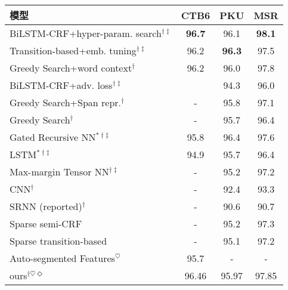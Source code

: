 \begin{table}[t]
	\vspace{0.5em}\centering\wuhao
	\begin{tabular}{lc c c}
		\toprule[1.5pt]
		模型 & CTB6 & PKU & MSR \\
		\midrule[1pt]
		BiLSTM-CRF+hyper-param. search$^{\dagger\ddagger}$  \cite{ma-ganchev-weiss:2018:EMNLP} & \textbf{96.7} & 96.1 & \textbf{98.1} \\
		Transition-based+emb. tuning$^{\dagger\ddagger}$  \cite{yang-zhang-dong:2017:Long} & 96.2 & \textbf{96.3} & 97.5 \\
		Greedy Search+word context$^{\dagger}$ \cite{zhou-EtAl:2017:EMNLP2017} & 96.2 & 96.0 & 97.8 \\
		BiLSTM-CRF+adv. loss$^{\dagger\ddagger}$ \cite{chen-EtAl:2017:Long2} & & 94.3 & 96.0 \\
		Greedy Search+Span repr.$^{\dagger}$ \cite{cai-EtAl:2017:Short} & - & 95.8 & 97.1 \\
		Greedy Search$^{\dagger}$ \cite{cai-zhao:2016:P16-1} & - & 95.7 & 96.4 \\
		Gated Recursive NN$^{*\dagger\ddagger}$ \cite{chen-EtAl:2015:ACL-IJCNLP5} & 95.8 & 96.4 & 97.6 \\
		LSTM$^{*\dagger\ddagger}$\cite{chen-EtAl:2015:EMNLP2} & 94.9 & 95.7 & 96.4 \\
		Max-margin Tensor NN$^{\dagger\ddagger}$ \cite{pei-ge-chang:2014:P14-1} & - & 95.2 & 97.2 \\
		CNN$^{\dagger}$ \cite{zheng-chen-xu:2013:EMNLP} & - & 92.4 & 93.3 \\
		SRNN (reported)$^{\dagger}$ \cite{DBLP:journals/corr/KongDS15} & - & 90.6 & 90.7 \\
		Sparse semi-CRF \cite{sun-EtAl:2009:NAACLHLT09} & - & 95.2 &  97.3 \\
		Sparse transition-based \cite{zhang-clark:2007:ACLMain} & - & 95.1 & 97.2 \\
		Auto-segmented Features$^\heartsuit$ \cite{wang-EtAl:2011:IJCNLP-2011} & 95.7 & - & - \\
		\midrule[1pt]
		ours$^{\dagger\heartsuit\Diamond}$ & 96.46 & 95.97 & 97.85 \\
		\bottomrule[1.5pt]
	\end{tabular}
\end{table}

